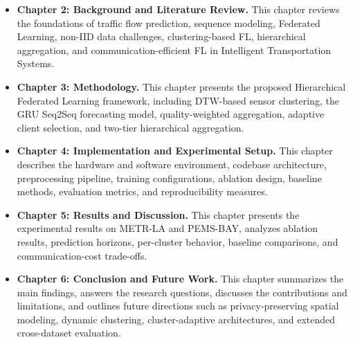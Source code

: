\begin{itemize}
    \item \textbf{Chapter 2: Background and Literature Review.} This chapter reviews the foundations of traffic flow prediction, sequence modeling, Federated Learning, non-IID data challenges, clustering-based FL, hierarchical aggregation, and communication-efficient FL in Intelligent Transportation Systems.
    
    \item \textbf{Chapter 3: Methodology.} This chapter presents the proposed Hierarchical Federated Learning framework, including DTW-based sensor clustering, the GRU Seq2Seq forecasting model, quality-weighted aggregation, adaptive client selection, and two-tier hierarchical aggregation.
    
    \item \textbf{Chapter 4: Implementation and Experimental Setup.} This chapter describes the hardware and software environment, codebase architecture, preprocessing pipeline, training configurations, ablation design, baseline methods, evaluation metrics, and reproducibility measures.
    
    \item \textbf{Chapter 5: Results and Discussion.} This chapter presents the experimental results on METR-LA and PEMS-BAY, analyzes ablation results, prediction horizons, per-cluster behavior, baseline comparisons, and communication-cost trade-offs.
    
    \item \textbf{Chapter 6: Conclusion and Future Work.} This chapter summarizes the main findings, answers the research questions, discusses the contributions and limitations, and outlines future directions such as privacy-preserving spatial modeling, dynamic clustering, cluster-adaptive architectures, and extended cross-dataset evaluation.
\end{itemize}